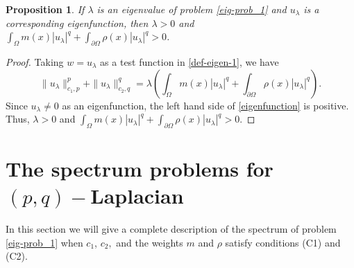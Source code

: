\documentclass[pdflatex,sn-mathphys-num]{sn-jnl}
\theoremstyle{thmstyleone}%
\newtheorem{proposition}[theorem]{Proposition}%
\theoremstyle{thmstyletwo}%
\theoremstyle{thmstylethree}%
\theoremstyle{thmstylethree}%
\begin{document}
\begin{proposition}\label{remark-lambda>0}
If $\lambda$ is an eigenvalue of problem \eqref{eig-prob_1} and $u_\lambda$ is a corresponding eigenfunction, then $\lambda>0$ and   $\displaystyle\int_\Omega m(x) |u_\lambda|^q + \int_{\partial\Omega} \rho(x) |u_\lambda|^q >0$.
\end{proposition}
\begin{proof}
Taking $w=u_\lambda$ as a test function in \eqref{def-eigen-1}, we have
\begin{equation}\label{eigenfunction}
\|u_\lambda\|_{c_1,p}^p+    \|u_\lambda\|_{c_2,q}^q=\lambda \left( \int_\Omega m(x) |u_\lambda|^q + \int_{\partial\Omega} \rho(x) |u_\lambda|^q \right).
\end{equation}
Since $u_\lambda \neq 0$ as an eigenfunction, the left hand side of \eqref{eigenfunction} is positive. Thus, $\lambda >0$ and  $\displaystyle\int_\Omega m(x) |u_\lambda|^q + \int_{\partial\Omega} \rho(x) |u_\lambda|^q >0$.
\end{proof}





\section{The spectrum  problems for $(p,q)-$Laplacian}
In this section we will give a complete description of the spectrum of problem \eqref{eig-prob_1}  when $c_1$, $ c_2,$ and the weights $ m$ and $\rho$ satisfy conditions (C1) and (C2).
\end{document}
